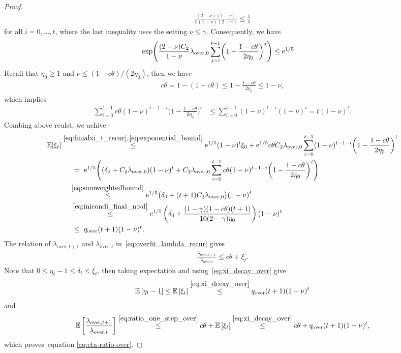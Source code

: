 \documentclass[11pt]{article}
\theoremstyle{plain}
\theoremstyle{definition}
\theoremstyle{remark}
\theoremstyle{plain}
\def\EB{{\mathbb E}}
\def \EBP #1{\EB\left[#1\right]}
\begin{document}
\begin{proof}
\begin{align*}
\frac{(2-\nu)(1-\gamma)}{5(1-\nu)(2-\gamma)}
\leq\frac{1}{5}
\end{align*}
for all  $i=0,\dots,t$, 
where the last inequality uses the setting $\nu\leq\gamma$.
Consequently, we have
\begin{align}
\label{eq:exponential_bound}
\exp\Biggl(\frac{(2-\nu)C_2}{1-\nu}
\lambda_{\mathrm{over},0}
\sum_{j=i}^{t-1}\biggl(1-\frac{1-c\theta}{2\eta_0}\biggr)^j\Biggr)
&\leq {\rm e}^{1/5}.
\end{align}
Recall that $\eta_0\geq1$ and $\nu\leq(1-c\theta)/(2\eta_0)$, then we have
\begin{align*}
c\theta=1-(1-c\theta)\leq1 - \frac{1-c\theta}{2\eta_0} \leq 1-\nu,
\end{align*}
which implies
\begin{align}
\label{eq:sumweightedbound}
\sum_{i=0}^{t-1}c\theta(1-\nu)^{t-1-i}
\biggl(1-\frac{1-c\theta}{2\eta_0}\biggr)^i
&\leq\sum_{i=0}^{t-1}(1-\nu)^{t-i}(1-\nu)^i
=t(1-\nu)^t.
\end{align}
Combing above reulst, we achive
\begin{align}
\mathbb E[\xi_t]
&\overset{\eqref{eq:finialxi_t_recur},\, \eqref{eq:exponential_bound}}{\leq} {\rm e}^{1/5}(1-\nu)^t\xi_0
 +{\rm e}^{1/5}c\theta C_2\lambda_{\mathrm{over},0}
 \sum_{i=0}^{t-1}(1-\nu)^{t-1-i}
 \biggl(1-\frac{1-c\theta}{2\eta_0}\biggr)^i\notag\\
&~~~~\,=\,\,{\rm e}^{1/5}\Biggl((\delta_0+C_2\lambda_{\mathrm{over},0})(1-\nu)^t
+C_2\lambda_{\mathrm{over},0}\sum_{i=0}^{t-1}c\theta(1-\nu)^{t-1-i}
\biggl(1-\frac{1-c\theta}{2\eta_0}\biggr)^i\Biggr)\notag\\
&\,\,\,~~\overset{\eqref{eq:sumweightedbound}}{\leq} {\rm e}^{1/5}
\bigl(\delta_0+(t+1)C_2\lambda_{\mathrm{over},0}\bigr)(1-\nu)^t\notag\\
&~~~~\overset{\eqref{eq:inicondi_final_n>d}}{\leq}
{\rm e}^{1/5}\left(\delta_0+
\frac{(1-\gamma)(1-c\theta)(t+1)}{10(2-\gamma)\eta_0}\right)
(1-\nu)^t\notag\\
\label{eq:xi_decay_over}
&~~\,\,\,\,\,\leq\,\,q_{\text{\rm over}}(t+1)(1-\nu)^t.
\end{align}
The relation of $\lambda_{\mathrm{over},t+1}$ and $\lambda_{\mathrm{over},t}$ in~\eqref{eq:overfit_lambda_recur} gives
\begin{align}
\label{eq:ratio_one_step_over}
\frac{\lambda_{\mathrm{over},t+1}}
{\lambda_{\mathrm{over},t}}
\leq c\theta+\xi_t.
\end{align}
Note that $0\leq\eta_t-1\leq\delta_t\leq\xi_t$, then taking expectation and using~\eqref{eq:xi_decay_over} give
\begin{align*}
\EBP{\eta_t-1}
\leq\EBP{\xi_t}
\overset{\eqref{eq:xi_decay_over}}{\leq}
q_{\text{\rm over}}(t+1)(1-\nu)^t\\
\end{align*}
and
\begin{align*}
\EBP{\frac{\lambda_{\mathrm{over},t+1}}{\lambda_{\mathrm{over},t}}}
\overset{\eqref{eq:ratio_one_step_over}}{\leq}
c\theta+\EBP{\xi_t}
\overset{\eqref{eq:xi_decay_over}}{\leq}
c\theta+q_{\text{\rm over}}(t+1)(1-\nu)^t,
\end{align*}
which proves~equation \eqref{eq:eta-ratio-over}.


\end{proof}
\end{document}
